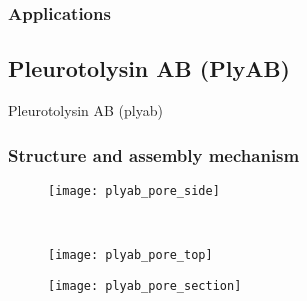 \subsubsection{Applications}



\subsection{Pleurotolysin AB (PlyAB)}

Pleurotolysin AB (\gls{plyab})

\subsubsection{Structure and assembly mechanism}

\begin{figure*}[t]
  \centering
  \medskip
  \begin{minipage}{56mm}
    \begin{subfigure}[t]{56mm}
      \centering
      \caption{}\vspace{-8.5mm}\hspace{1.5mm}\label{fig:plyab_pore_side}
      \texttt{[image: plyab\_pore\_side]}
    \end{subfigure}
    \vspace{5mm} \\
    \begin{subfigure}[t]{56mm}
      \centering
      \caption{}\vspace{-8.5mm}\hspace{1.5mm}\label{fig:plyab_pore_top}
      \texttt{[image: plyab\_pore\_top]}
    \end{subfigure}
  \end{minipage}
  \begin{minipage}{60mm}
    \begin{subfigure}[t]{56mm}
      \centering
      \caption{}\vspace{-8.5mm}\hspace{1.5mm}\label{fig:plyab_pore_section}
      \texttt{[image: plyab\_pore\_section]}
    \end{subfigure}
    \vspace{5mm} \\ 
    \begin{subfigure}[t]{35mm}
      \caption{}\vspace{-8.5mm}\hspace{1.5mm}\label{fig:plyab_monomer}

\end{subfigure}
\end{minipage}
\end{figure*}
